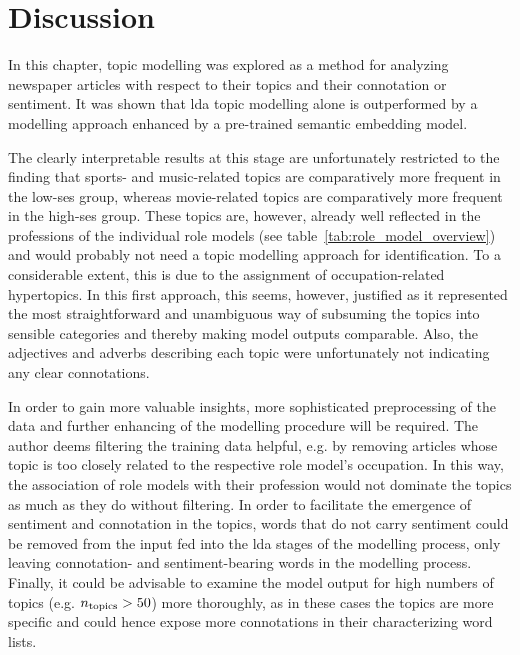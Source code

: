 \section{Discussion}
In this chapter, topic modelling was explored as a method for analyzing newspaper articles with respect to their topics and their connotation or sentiment. It was shown that \gls{lda} topic modelling alone is outperformed by a modelling approach enhanced by a pre-trained semantic embedding model.

The clearly interpretable results at this stage are unfortunately restricted to the  finding that sports- and music-related topics are comparatively more frequent in the low-\gls{ses} group, whereas movie-related topics are comparatively more frequent in the high-\gls{ses} group. These topics are, however, already well reflected in the professions of the individual role models (see table~\ref{tab:role_model_overview}) and would probably not need a topic modelling approach for identification. To a considerable extent, this is due to the assignment of occupation-related hypertopics. In this first approach, this seems, however, justified as it represented the most straightforward and unambiguous way of subsuming the topics into sensible categories and thereby making model outputs comparable. Also, the adjectives and adverbs describing each topic were unfortunately not indicating any clear connotations.

In order to gain more valuable insights, more sophisticated preprocessing of the data and further enhancing of the modelling procedure will be required. The author deems filtering the training data helpful, e.g. by removing articles whose topic is too closely related to the respective role model's occupation. In this way, the association of role models with their profession would not dominate the topics as much as they do without filtering. In order to facilitate the emergence of sentiment and connotation in the topics, words that do not carry sentiment could be removed from the input fed into the \gls{lda} stages of the modelling process, only leaving connotation- and  sentiment-bearing words in the modelling process. Finally, it could be advisable to examine the model output for high numbers of topics (e.g. $n_\text{topics}>50$) more thoroughly, as in these cases the topics are more specific and could hence expose more connotations in their characterizing word lists.